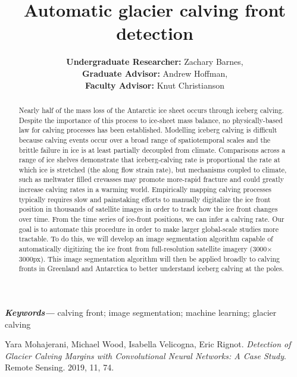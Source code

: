 \documentclass[a4paper]{article}
\title{Automatic glacier calving front detection}
\author{\textbf{Undergraduate Researcher:}
Zachary Barnes, \\ \textbf{Graduate Advisor:} Andrew Hoffman,\\ \textbf{Faculty Advisor:} Knut Christianson  \\
}
\date{} %
\providecommand{\keywords}[1]
{
  \small	
  \textbf{\textit{Keywords---}} #1
}
\begin{document}
\maketitle

\begin{abstract} 
Nearly half of the mass loss of the Antarctic ice sheet occurs through iceberg calving. Despite the importance of this process to ice-sheet mass balance, no physically-based law for calving processes has been established. Modelling iceberg calving is difficult because calving events occur over a broad range of spatiotemporal scales and the brittle failure in ice is at least partially decoupled from climate. Comparisons across a range of ice shelves demonstrate that iceberg-calving rate is proportional the rate at which ice is stretched (the along flow strain rate), but mechanisms coupled to climate, such as meltwater filled crevasses may promote more-rapid fracture and could greatly increase calving rates in a warming world. Empirically mapping calving processes typically requires slow and painstaking efforts to manually digitalize the ice front position in thousands of satellite images in order to track how the ice front changes over time. From the time series of ice-front positions, we can infer a calving rate. Our goal is to automate this procedure in order to make larger global-scale studies more tractable. To do this, we will develop an image segmentation algorithm capable of automatically digitizing the ice front from full-resolution satellite imagery (3000$\times$3000px). This image segmentation algorithm will then be applied broadly to calving fronts in Greenland and Antarctica to better understand iceberg calving at the poles.
\end{abstract} \hspace{10pt}

\keywords{calving front; image segmentation; machine learning;  glacier calving}

\begin{thebibliography}{00}
 Yara Mohajerani, Michael Wood, Isabella Velicogna, Eric Rignot. \textit{Detection of Glacier Calving Margins with Convolutional Neural Networks: A Case Study}. Remote Sensing. 2019, 11, 74.

\end{thebibliography}


%
\end{document}
